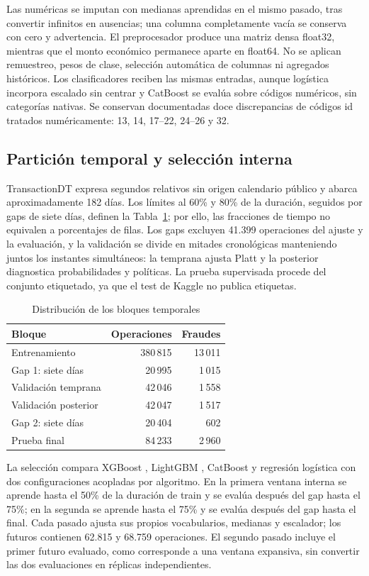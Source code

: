 \documentclass[conference,letterpaper]{IEEEtran}
\begin{document}
Las numéricas se imputan con medianas aprendidas en el mismo pasado, tras convertir infinitos en ausencias; una columna completamente vacía se conserva con cero y advertencia. El preprocesador produce una matriz densa float32, mientras que el monto económico permanece aparte en float64. No se aplican remuestreo, pesos de clase, selección automática de columnas ni agregados históricos. Los clasificadores reciben las mismas entradas, aunque logística incorpora escalado sin centrar y CatBoost se evalúa sobre códigos numéricos, sin categorías nativas. Se conservan documentadas doce discrepancias de códigos id tratados numéricamente: 13, 14, 17--22, 24--26 y 32.

\subsection{Partición temporal y selección interna}
TransactionDT expresa segundos relativos sin origen calendario público y abarca aproximadamente 182 días. Los límites al 60\% y 80\% de la duración, seguidos por gaps de siete días, definen la Tabla~\ref{tab:split}; por ello, las fracciones de tiempo no equivalen a porcentajes de filas. Los gaps excluyen 41.399 operaciones del ajuste y la evaluación, y la validación se divide en mitades cronológicas manteniendo juntos los instantes simultáneos: la temprana ajusta Platt y la posterior diagnostica probabilidades y políticas. La prueba supervisada procede del conjunto etiquetado, ya que el test de Kaggle no publica etiquetas.

\begin{table}[t]
\caption{Distribución de los bloques temporales}
\label{tab:split}\centering\small
\begin{tabular}{lrr}\toprule
Bloque & Operaciones & Fraudes\\\midrule
Entrenamiento & 380\,815 & 13\,011\\
Gap 1: siete días & 20\,995 & 1\,015\\
Validación temprana & 42\,046 & 1\,558\\
Validación posterior & 42\,047 & 1\,517\\
Gap 2: siete días & 20\,404 & 602\\
Prueba final & 84\,233 & 2\,960\\\bottomrule
\end{tabular}
\end{table}

La selección compara XGBoost \cite{xgb}, LightGBM \cite{lgb}, CatBoost \cite{cat} y regresión logística con dos configuraciones acopladas por algoritmo. En la primera ventana interna se aprende hasta el 50\% de la duración de train y se evalúa después del gap hasta el 75\%; en la segunda se aprende hasta el 75\% y se evalúa después del gap hasta el final. Cada pasado ajusta sus propios vocabularios, medianas y escalador; los futuros contienen 62.815 y 68.759 operaciones. El segundo pasado incluye el primer futuro evaluado, como corresponde a una ventana expansiva, sin convertir las dos evaluaciones en réplicas independientes.
\end{document}
